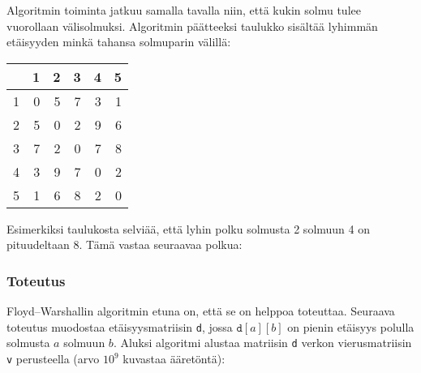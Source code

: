 Algoritmin toiminta jatkuu samalla tavalla
niin, että kukin solmu tulee vuorollaan
välisolmuksi.
Algoritmin päätteeksi taulukko sisältää
lyhimmän etäisyyden minkä tahansa
solmuparin välillä:

\begin{center}
\begin{tabular}{r|rrrrr}
 & 1 & 2 & 3 & 4 & 5 \\
\hline
1 & 0 & 5 & 7 & 3 & 1 \\
2 & 5 & 0 & 2 & 9 & 6 \\
3 & 7 & 2 & 0 & 7 & 8 \\
4 & 3 & 9 & 7 & 0 & 2 \\
5 & 1 & 6 & 8 & 2 & 0 \\
\end{tabular}
\end{center}

Esimerkiksi taulukosta selviää, että lyhin polku
solmusta 2 solmuun 4 on pituudeltaan 8.
Tämä vastaa seuraavaa polkua:

\begin{center}
\end{center}

\subsubsection{Toteutus}

Floyd–Warshallin algoritmin etuna on,
että se on helppoa toteuttaa.
Seuraava toteutus muodostaa etäisyysmatriisin
\texttt{d}, jossa $\texttt{d}[a][b]$
on pienin etäisyys polulla solmusta $a$ solmuun $b$.
Aluksi algoritmi alustaa matriisin \texttt{d}
verkon vierusmatriisin \texttt{v} perusteella
(arvo $10^9$ kuvastaa ääretöntä):

